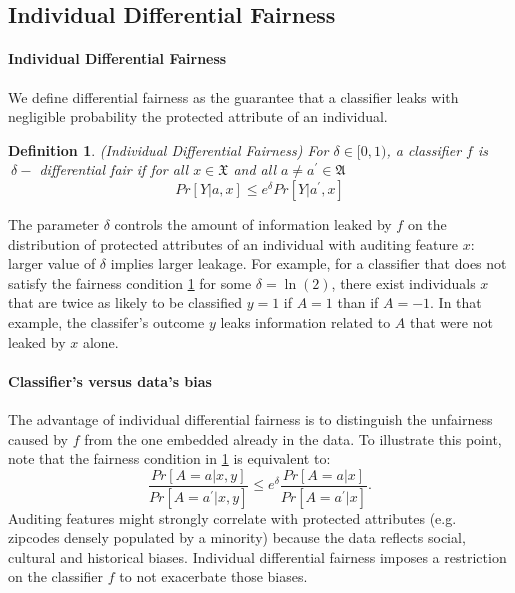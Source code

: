 \documentclass{article}
\newtheorem{defn}{Definition}[section]
\begin{document}
\subsection{Individual Differential Fairness}
\paragraph{Individual Differential Fairness} 
We define differential fairness as the guarantee that a classifier leaks with negligible probability the protected attribute of an individual.

\begin{defn}(Individual Differential Fairness)
\label{def: idf}
For $\delta \in [0, 1)$, a classifier $f$ is $\ \delta-$ differential fair if for all $x\in\mathfrak{X}$ and all $a\neq a^{'}\in \mathfrak{A}$
\begin{equation}
\label{eq: idf}
    Pr[Y|a, x] \leq e^{\delta}Pr[Y|a^{'}, x]
\end{equation}
\end{defn}

The parameter $\delta$ controls the amount of information leaked by $f$ on the distribution of protected attributes of an individual with auditing feature $x$: larger value of $\delta$ implies larger leakage. For example, for a classifier that does not satisfy the fairness condition \ref{def: idf} for some $\delta=\ln(2)$, there exist individuals $x$ that are twice as likely to be classified $y=1$ if $A=1$ than if $A=-1$. In that example, the classifer's outcome $y$ leaks information related to $A$ that were not leaked by $x$ alone.   

\paragraph{Classifier's versus data's bias}
The advantage of individual differential fairness is to distinguish the unfairness caused by $f$  from the one embedded already in the data. To illustrate this point, note that the fairness condition in \ref{def: idf} is equivalent to:
\begin{equation}
    \frac{Pr[A=a|x, y]}{Pr[A=a^{'}|x, y]} \leq e^{\delta}\frac{Pr[A=a|x]}{Pr[A=a^{'}|x]}.
\end{equation}
Auditing features might strongly correlate with protected attributes (e.g. zipcodes densely populated by a minority) because the data reflects social, cultural and historical biases. Individual differential fairness imposes a restriction on the classifier $f$ to not exacerbate those biases.  
\end{document}
